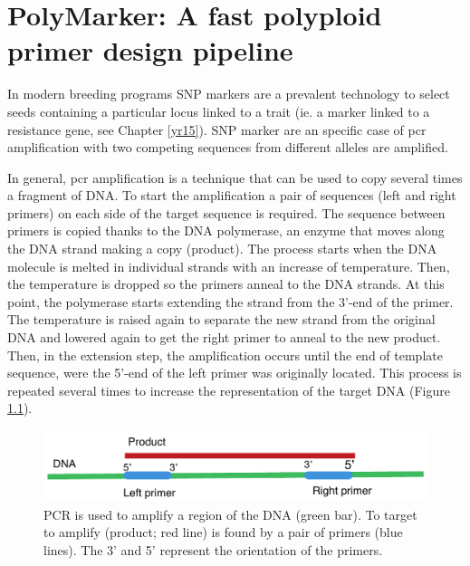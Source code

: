 
\chapter{PolyMarker: A fast polyploid primer design pipeline}
\label{cha:polymarker}

In modern breeding programs SNP markers are a prevalent technology to select seeds containing a particular locus linked to a trait (ie. a marker linked to a resistance gene, see Chapter \ref{yr15}). 
SNP marker are an specific case of \gls{pcr} amplification with two competing sequences from different alleles are amplified. 

In general, \acrshort{pcr} amplification is a technique that can be used to copy several times a fragment of DNA. 
To start the amplification a pair of sequences (left and right primers) on each side of the target sequence is required. 
The sequence between primers is copied thanks to the DNA polymerase, an enzyme that moves along the DNA strand making a copy (product). 
The process starts when the DNA molecule is melted in individual strands with an increase of temperature. 
Then, the temperature is dropped so the primers anneal to the DNA strands. 
At this point, the polymerase starts extending the strand from the 3'-end of the primer. 
The temperature is raised again to separate the new strand from the original DNA and lowered again to get the right primer to anneal to the new product.
Then, in the extension step, the amplification occurs until the end of template sequence, were the 5'-end of the left primer was originally located. 
This process is repeated several times to increase the representation of the target DNA (Figure \ref{fig:poly:amplificationProduct}).  

\begin{figure}
\includegraphics[width=1\textwidth]{PolyMarker/Figures/intro/amplificationProduct.pdf}
\caption{PCR is used to amplify a region of the DNA (green bar). To target to amplify (product; red line) is found by a pair of primers (blue lines). The 3' and 5' represent the orientation of the primers.}
\label{fig:poly:amplificationProduct}
\end{figure}


